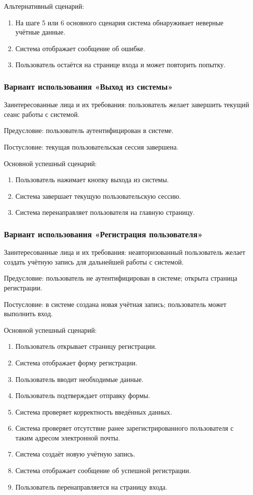 Альтернативный сценарий:
\begin{enumerate}
	\item На шаге 5 или 6 основного сценария система обнаруживает неверные учётные данные.
	\item Система отображает сообщение об ошибке.
	\item Пользователь остаётся на странице входа и может повторить попытку.
\end{enumerate}

\subsubsection{Вариант использования «Выход из системы»}

Заинтересованные лица и их требования: пользователь желает завершить текущий сеанс работы с системой.

Предусловие: пользователь аутентифицирован в системе.

Постусловие: текущая пользовательская сессия завершена.

Основной успешный сценарий:
\begin{enumerate}
	\item Пользователь нажимает кнопку выхода из системы.
	\item Система завершает текущую пользовательскую сессию.
	\item Система перенаправляет пользователя на главную страницу.
\end{enumerate}

\subsubsection{Вариант использования «Регистрация пользователя»}

Заинтересованные лица и их требования: неавторизованный пользователь желает создать учётную запись для дальнейшей работы с системой.

Предусловие: пользователь не аутентифицирован в системе; открыта страница регистрации.

Постусловие: в системе создана новая учётная запись; пользователь может выполнить вход.

Основной успешный сценарий:
\begin{enumerate}
	\item Пользователь открывает страницу регистрации.
	\item Система отображает форму регистрации.
	\item Пользователь вводит необходимые данные.
	\item Пользователь подтверждает отправку формы.
	\item Система проверяет корректность введённых данных.
	\item Система проверяет отсутствие ранее зарегистрированного пользователя с таким адресом электронной почты.
	\item Система создаёт новую учётную запись.
	\item Система отображает сообщение об успешной регистрации.
	\item Пользователь перенаправляется на страницу входа.
\end{enumerate}

